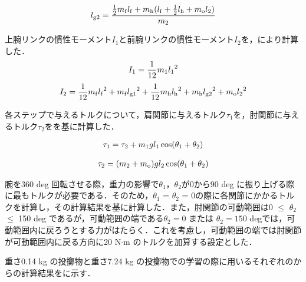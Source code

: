 \begin{eqnarray}
  \equlabel{2.28}
  l_{\mathrm{g2}}=\frac{\frac{1}{2}m_{\mathrm{f}}l_{\mathrm{f}}+m_{\mathrm{h}}(l_{\mathrm{f}}+\frac{1}{2}l_{\mathrm{h}}+m_{\mathrm{o}}l_{2})}{m_{2}}
\end{eqnarray}

上腕リンクの慣性モーメント$I_{1}$と前腕リンクの慣性モーメント$I_{2}$を，により計算した．
\begin{eqnarray}
  \equlabel{2.29}
  I_{1}=\frac{1}{12}m_{1}{l_{1}}^{2}
\end{eqnarray}
\begin{eqnarray}
  \equlabel{2.30}
  I_{2}=\frac{1}{12}m_{\mathrm{f}}{l_{\mathrm{f}}}^{2}+m_{\mathrm{f}}{l_{\mathrm{g1}}}^{2}+\frac{1}{12}m_{\mathrm{h}}{l_{\mathrm{h}}}^{2}+m_{\mathrm{h}}{l_{\mathrm{g2}}}^{2}+m_{\mathrm{o}}{l_{2}}^{2}
\end{eqnarray}

各ステップで与えるトルクについて，肩関節に与えるトルク$\tau_{1}$を，肘関節に与えるトルク$\tau_{2}$をを基に計算した．

\begin{eqnarray}
  \equlabel{2.31}
  \tau_{1} = \tau_{2} + m_{1}gl_{1}\cos(\theta_{1} + \theta_{2})
\end{eqnarray}

\begin{eqnarray}
  \equlabel{2.32}
  \tau_{2} = (m_{2} + m_{\mathrm{o}})gl_{2}\cos(\theta_{1} + \theta_{2})
\end{eqnarray}

腕を360 deg 回転させる際，重力の影響で$\theta_{1}$，$\theta_{2}$が0から90 deg に振り上げる際に最もトルクが必要である．そのため，$\theta_{1}$ = $\theta_{2}$ = 0の際に各関節にかかるトルクを計算し，その計算結果を基に計算した．また，肘関節の可動範囲は0 $\le$ $\theta_{2}$ $\le$ 150 deg であるが，可動範囲の端である$\theta_{2} = 0$ または $\theta_{2} = 150$ degでは，可動範囲内に戻ろうとする力がはたらく．これを考慮し，可動範囲の端では肘関節が可動範囲内に戻る方向に20 N$\cdot$m のトルクを加算する設定とした．

重さ0.14 kg の投擲物と重さ7.24 kg の投擲物での学習の際に用いるそれぞれのからの計算結果をに示す．

